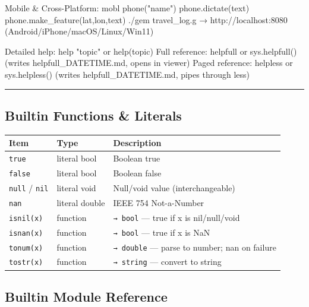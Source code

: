 \documentclass[
]{article}
\newenvironment{Shaded}{}{}
\newcommand{\NormalTok}[1]{#1}
\newcounter{none} %
\begin{document}
\begin{Shaded}
\begin{Highlighting}[]
\NormalTok{Mobile \& Cross{-}Platform:}
\NormalTok{  mobl phone("name")  phone.dictate(text)  phone.make\_feature(lat,lon,text)}
\NormalTok{  ./gem travel\_log.g  →  http://localhost:8080  (Android/iPhone/macOS/Linux/Win11)}

\NormalTok{Detailed help: help "topic"  or  help(topic)}
\NormalTok{Full reference: helpfull  or  sys.helpfull()  (writes helpfull\_DATETIME.md, opens in viewer)}
\NormalTok{Paged reference: helpless  or  sys.helpless()  (writes helpfull\_DATETIME.md, pipes through less)}
\end{Highlighting}
\end{Shaded}

\begin{center}\rule{0.5\linewidth}{0.5pt}\end{center}

\subsection{Builtin Functions \&
Literals}\label{builtin-functions-literals}

{\def\LTcaptype{none} %
\begin{longtable}[]{@{}lll@{}}
\toprule\noalign{}
Item & Type & Description \\
\midrule\noalign{}
\endhead
\bottomrule\noalign{}
\endlastfoot
\texttt{true} & literal bool & Boolean true \\
\texttt{false} & literal bool & Boolean false \\
\texttt{null} / \texttt{nil} & literal void & Null/void value
(interchangeable) \\
\texttt{nan} & literal double & IEEE 754 Not-a-Number \\
\texttt{isnil(x)} & function & \texttt{→\ bool} --- true if x is
nil/null/void \\
\texttt{isnan(x)} & function & \texttt{→\ bool} --- true if x is NaN \\
\texttt{tonum(x)} & function & \texttt{→\ double} --- parse to number;
nan on failure \\
\texttt{tostr(x)} & function & \texttt{→\ string} --- convert to
string \\
\end{longtable}
}

\subsection{Builtin Module Reference}\label{builtin-module-reference}
\end{document}

